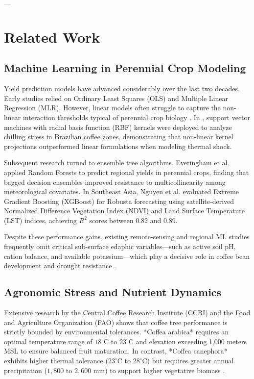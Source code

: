 \documentclass[conference]{IEEEtran}
\begin{document}
---

\section{Related Work}

\subsection{Machine Learning in Perennial Crop Modeling}
Yield prediction models have advanced considerably over the last two decades. Early studies relied on Ordinary Least Squares (OLS) and Multiple Linear Regression (MLR). However, linear models often struggle to capture the non-linear interaction thresholds typical of perennial crop biology \cite{everingham2021}. In \cite{ramalho2013}, support vector machines with radial basis function (RBF) kernels were deployed to analyze chilling stress in Brazilian coffee zones, demonstrating that non-linear kernel projections outperformed linear formulations when modeling thermal shock.

Subsequent research turned to ensemble tree algorithms. Everingham et al. \cite{everingham2021} applied Random Forests to predict regional yields in perennial crops, finding that bagged decision ensembles improved resistance to multicollinearity among meteorological covariates. In Southeast Asia, Nguyen et al. \cite{nguyen2022} evaluated Extreme Gradient Boosting (XGBoost) for Robusta forecasting using satellite-derived Normalized Difference Vegetation Index (NDVI) and Land Surface Temperature (LST) indices, achieving $R^2$ scores between 0.82 and 0.89. 

Despite these performance gains, existing remote-sensing and regional ML studies frequently omit critical sub-surface edaphic variables—such as active soil pH, cation balance, and available potassium—which play a decisive role in coffee bean development and drought resistance \cite{martins2021}.

\subsection{Agronomic Stress and Nutrient Dynamics}
Extensive research by the Central Coffee Research Institute (CCRI) \cite{coffeeboard2022} and the Food and Agriculture Organization (FAO) \cite{fao2018} shows that coffee tree performance is strictly bounded by environmental tolerances. *Coffea arabica* requires an optimal temperature range of $18^\circ\text{C}$ to $23^\circ\text{C}$ and elevation exceeding 1,000 meters MSL to ensure balanced fruit maturation. In contrast, *Coffea canephora* exhibits higher thermal tolerance ($23^\circ\text{C}$ to $28^\circ\text{C}$) but requires greater annual precipitation ($1,800$ to $2,600\text{ mm}$) to support higher vegetative biomass \cite{davis2019}. 
\end{document}
